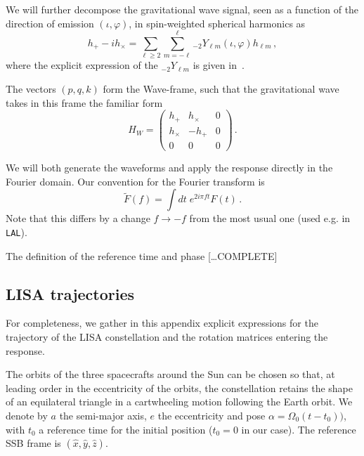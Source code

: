 \documentclass[aps,showpacs,twocolumn,prd,superscriptaddress,nofootinbib]{revtex4-1}
\newcommand{\be}{\begin{equation}}
\newcommand{\ee}{\end{equation}}
\newcommand{\SM}[1]{{\color{Blue} #1}}
\begin{document}
We will further decompose the gravitational wave signal, seen as a function of the direction of emission $(\iota, \varphi)$, in spin-weighted spherical harmonics as
\be\label{eq:apphpcmodes}
	h_{+} - i h_{\times} = \sum_{\ell \geq 2} \sum_{m = -\ell}^{\ell} {}_{-2}Y_{\ell m} (\iota, \varphi) h_{\ell m} \,,
\ee
where the explicit expression of the ${}_{-2}Y_{\ell m}$ is given in~\cite{}.

The vectors $(p,q,k)$ form the Wave-frame, such that the gravitational wave takes in this frame the familiar form
\be
	H_{W} = \begin{pmatrix}
		h_{+} & h_{\times} & 0 \\
		h_{\times} & -h_{+} & 0 \\
		0 & 0 & 0
		\end{pmatrix} \,.
\ee

We will both generate the waveforms and apply the response directly in the Fourier domain. Our convention for the Fourier transform is
\be\label{eq:defFourier}
	\tilde{F}(f) = \int dt \; e^{2 i \pi f t} F(t) \,.
\ee
Note that this differs by a change $f\rightarrow -f$ from the most usual one (used e.g. in \texttt{LAL}).

The definition of the reference time and phase \SM{[\dots COMPLETE]}


\subsection{LISA trajectories}
\label{sec:lisatraj}

For completeness, we gather in this appendix explicit expressions for the trajectory of the LISA constellation and the rotation matrices entering the response.

The orbits of the three spacecrafts around the Sun can be chosen so that, at leading order in the eccentricity of the orbits, the constellation retains the shape of an equilateral triangle in a cartwheeling motion following the Earth orbit. We denote by $a$ the semi-major axis, $e$ the eccentricity and pose $\alpha = \Omega_{0} (t-t_{0}))$, with $t_{0}$ a reference time for the initial position ($t_{0} = 0$ in our case). The reference SSB frame is $(\hat{x}, \hat{y}, \hat{z})$.
\end{document}
